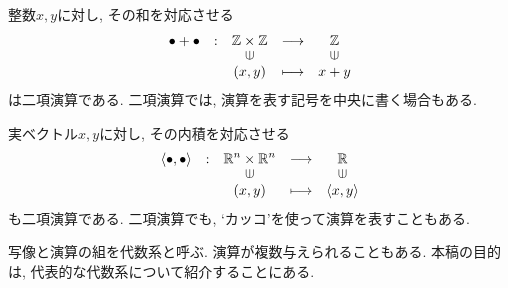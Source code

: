 \begin{example}
  整数$x,y$に対し, その和を対応させる
  \begin{align*}
    \shazo{\bullet+\bullet}
          {\ZZ\times \ZZ}{\ZZ}
          {(x,y)}{x+y}
  \end{align*}
  は二項演算である.
  二項演算では, 演算を表す記号を中央に書く場合もある.
\end{example}
\begin{example}
  実ベクトル$x,y$に対し, その内積を対応させる
  \begin{align*}
    \shazo{\Braket{\bullet,\bullet}}
          {\RR^n\times \RR^n}{\RR}
          {(x,y)}{\Braket{x,y}}
  \end{align*}
  も二項演算である.
  二項演算でも, `カッコ'を使って演算を表すこともある.
\end{example}

写像と演算の組を代数系と呼ぶ.
演算が複数与えられることもある.
本稿の目的は,
代表的な代数系について紹介することにある.


